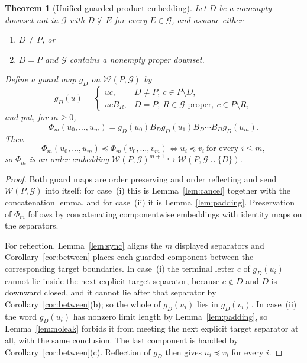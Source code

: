 \documentclass[11pt,a4paper]{article}
\numberwithin{equation}{section}
\newtheorem{theorem}{Theorem}[section]
\theoremstyle{definition}
\theoremstyle{remark}
\newcommand{\W}{\mathcal W}
\newcommand{\G}{\mathcal G}
\newcommand{\emb}{\preccurlyeq}
\begin{document}
\begin{theorem}[Unified guarded product embedding]\label{thm:product}
Let $D$ be a nonempty downset not in $\G$ with $D\nsubseteq E$ for every
$E\in\G$, and assume either
\begin{enumerate}[label=\textnormal{(\roman*)}]
\item $D\ne P$, or
\item $D=P$ and $\G$ contains a nonempty proper downset.
\end{enumerate}
Define a guard map $g_D$ on $\W(P,\G)$ by
\begin{equation}\label{eq:unifiedguard}
 g_D(u)=
 \begin{cases}
  uc,&D\ne P,\ c\in P\setminus D,\\
  ucB_R,&D=P,\ R\in\G\text{ proper},\ c\in P\setminus R,
 \end{cases}
\end{equation}
and put, for $m\ge0$,
\begin{equation}\label{eq:unifiedmap}
 \Phi_m(u_0,\ldots,u_m)=g_D(u_0)B_Dg_D(u_1)B_D\cdots B_Dg_D(u_m).
\end{equation}
Then
\[
 \Phi_m(u_0,\ldots,u_m)\emb\Phi_m(v_0,\ldots,v_m)
 \iff u_i\emb v_i\ \text{for every }i\le m,
\]
so $\Phi_m$ is an order embedding
$\W(P,\G)^{m+1}\hookrightarrow\W(P,\G\cup\{D\})$.
\end{theorem}
\begin{proof}
Both guard maps are order preserving and order reflecting and send
$\W(P,\G)$ into itself: for case~(i) this is Lemma~\ref{lem:cancel} together
with the concatenation lemma, and for case~(ii) it is
Lemma~\ref{lem:padding}. Preservation of $\Phi_m$ follows by concatenating
componentwise embeddings with identity maps on the separators.

For reflection, Lemma~\ref{lem:sync} aligns the $m$ displayed separators and
Corollary~\ref{cor:between} places each guarded component between the
corresponding target boundaries. In case~(i) the terminal letter $c$ of
$g_D(u_i)$ cannot lie inside the next explicit target separator, because
$c\notin D$ and $D$ is downward closed, and it cannot lie after that separator
by Corollary~\ref{cor:between}(b); so the whole of $g_D(u_i)$ lies in
$g_D(v_i)$. In case~(ii) the word $g_D(u_i)$ has nonzero limit length by
Lemma~\ref{lem:padding}, so Lemma~\ref{lem:noleak} forbids it from meeting the
next explicit target separator at all, with the same conclusion. The last
component is handled by Corollary~\ref{cor:between}(c). Reflection of $g_D$
then gives $u_i\emb v_i$ for every $i$.
\end{proof}
\end{document}

